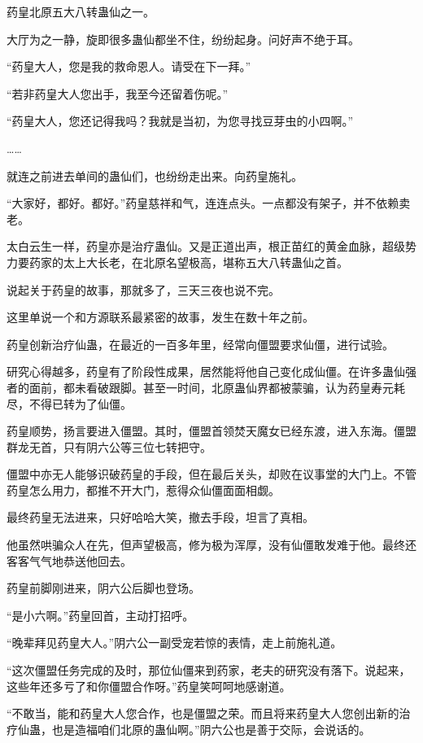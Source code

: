 \begin{this_body}
药皇北原五大八转蛊仙之一。

大厅为之一静，旋即很多蛊仙都坐不住，纷纷起身。问好声不绝于耳。

“药皇大人，您是我的救命恩人。请受在下一拜。”

“若非药皇大人您出手，我至今还留着伤呢。”

“药皇大人，您还记得我吗？我就是当初，为您寻找豆芽虫的小四啊。”

……

就连之前进去单间的蛊仙们，也纷纷走出来。向药皇施礼。

“大家好，都好。都好。”药皇慈祥和气，连连点头。一点都没有架子，并不依赖卖老。

太白云生一样，药皇亦是治疗蛊仙。又是正道出声，根正苗红的黄金血脉，超级势力要药家的太上大长老，在北原名望极高，堪称五大八转蛊仙之首。

说起关于药皇的故事，那就多了，三天三夜也说不完。

这里单说一个和方源联系最紧密的故事，发生在数十年之前。

药皇创新治疗仙蛊，在最近的一百多年里，经常向僵盟要求仙僵，进行试验。

研究心得越多，药皇有了阶段性成果，居然能将他自己变化成仙僵。在许多蛊仙强者的面前，都未看破跟脚。甚至一时间，北原蛊仙界都被蒙骗，认为药皇寿元耗尽，不得已转为了仙僵。

药皇顺势，扬言要进入僵盟。其时，僵盟首领焚天魔女已经东渡，进入东海。僵盟群龙无首，只有阴六公等三位七转把守。

僵盟中亦无人能够识破药皇的手段，但在最后关头，却败在议事堂的大门上。不管药皇怎么用力，都推不开大门，惹得众仙僵面面相觑。

最终药皇无法进来，只好哈哈大笑，撤去手段，坦言了真相。

他虽然哄骗众人在先，但声望极高，修为极为浑厚，没有仙僵敢发难于他。最终还客客气气地恭送他回去。

药皇前脚刚进来，阴六公后脚也登场。

“是小六啊。”药皇回首，主动打招呼。

“晚辈拜见药皇大人。”阴六公一副受宠若惊的表情，走上前施礼道。

“这次僵盟任务完成的及时，那位仙僵来到药家，老夫的研究没有落下。说起来，这些年还多亏了和你僵盟合作呀。”药皇笑呵呵地感谢道。

“不敢当，能和药皇大人您合作，也是僵盟之荣。而且将来药皇大人您创出新的治疗仙蛊，也是造福咱们北原的蛊仙啊。”阴六公也是善于交际，会说话的。


\end{this_body}
